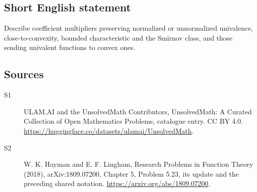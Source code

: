 \documentclass[11pt]{article}
\begin{document}
\subsection{Short English statement}
Describe coefficient multipliers preserving normalized or unnormalized univalence, close-to-convexity, bounded characteristic and the Smirnov class, and those sending univalent functions to convex ones.
\subsection{Sources}
\begin{description}
\item[\hypertarget{source:statement:1}{S1}] ULAM.AI and the UnsolvedMath Contributors, UnsolvedMath: A Curated Collection of Open Mathematics Problems, catalogue entry. CC BY 4.0. \url{https://huggingface.co/datasets/ulamai/UnsolvedMath}.
\item[\hypertarget{source:statement:2}{S2}] W. K. Hayman and E. F. Lingham, Research Problems in Function Theory (2018), arXiv:1809.07200, Chapter 5, Problem 5.23, its update and the preceding shared notation. \url{https://arxiv.org/abs/1809.07200}.
\end{description}
\label{end:statement}
\end{document}

